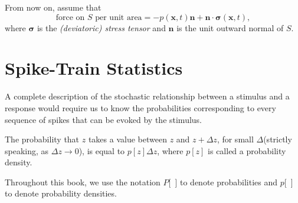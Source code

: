 

\begin{asm}
  \label{asm:surfaceForceViscous}
  From now on, 
  assume that
  \begin{equation}
    \label{equ:surfaceForceSigma}
    \text{force on $S$ per unit area} = -p(\mathbf{x}, t)\mathbf{n}+\mathbf{n}\cdot\boldsymbol\sigma(\mathbf{x}, t), 
  \end{equation}
  where $\boldsymbol\sigma$ is the \emph{(deviatoric) stress tensor} and
  $\mathbf{n}$ is the unit outward normal of $S$.
\end{asm}

\newpage
\section{Spike-Train Statistics}
\label{sec:1.4}


\begin{rem}
        A complete description of the stochastic relationship between a stimulus and a response would require us to know the probabilities corresponding to every sequence of spikes that can be evoked by the stimulus.    
\end{rem}

\begin{lem}
    The probability that $z$ takes a value between $z$ and $z+ \Delta z$, for small $\Delta$(strictly speaking, as $\Delta z \to 0$), is equal to $p[z]\Delta z$, where $p[z]$ is called a probability density.
\end{lem}

\begin{ntn}    
    Throughout this book,  we use the notation $P$[\ ] to denote probabilities and $p$[\ ] to denote probability densities.
\end{ntn}    


